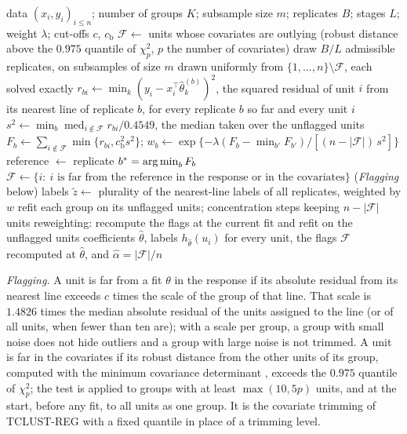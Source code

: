 \begin{algorithm}[tbp]
\caption{ESF: clusterwise regression from exactly solved subsamples, with sequential flagging}
\label{alg:adaptive}
\begin{algorithmic}[1]
\Require data $(x_i,y_i)_{i\le n}$; number of groups $K$; subsample size $m$; replicates $B$;
stages $L$; weight $\lambda$; cut-offs $c$, $c_{\mathrm b}$
\State $\mathcal F\leftarrow$ units whose covariates are outlying (robust distance above the
$0.975$ quantile of $\chi^{2}_{p}$, $p$ the number of covariates)
  \State draw $B/L$ admissible replicates, on subsamples of size $m$ drawn uniformly from
    $\{1,\dots,n\}\setminus\mathcal F$, each solved exactly
  \State $r_{bi}\leftarrow\min_k(y_i-x_i^{\top}\hat\theta^{(b)}_k)^{2}$, the squared residual
    of unit $i$ from its nearest line of replicate $b$, for every replicate $b$ so far and
    every unit $i$
  \State $s^{2}\leftarrow\min_b\operatorname{med}_{i\notin\mathcal F}r_{bi}/0.4549$, the median
    taken over the unflagged units
  \State $F_b\leftarrow\sum_{i\notin\mathcal F}\min\{r_{bi},c_{\mathrm b}^{2}s^{2}\}$;\quad
    $w_b\leftarrow\exp\{-\lambda(F_b-\min_{b'}F_{b'})/[(n-|\mathcal F|)\,s^{2}]\}$
  \State reference $\leftarrow$ replicate $b^{\ast}=\operatorname*{arg\,min}_bF_b$
  \State $\mathcal F\leftarrow\{i:\ \text{$i$ is far from the reference in the response or in
    the covariates}\}$ (\emph{Flagging} below)
\EndFor
\State labels $\tilde z\leftarrow$ plurality of the nearest-line labels of all replicates,
  weighted by $w$
\State refit each group on its unflagged units; concentration steps keeping $n-|\mathcal F|$
  units
\State reweighting: recompute the flags at the current fit and refit on the unflagged units
\State \Return coefficients $\hat\theta$, labels $h_{\hat\theta}(u_i)$ for every unit, the flags
  $\mathcal F$ recomputed at $\hat\theta$, and $\hat\alpha=|\mathcal F|/n$
\end{algorithmic}
\end{algorithm}

\emph{Flagging.} A unit is far from a fit $\theta$ in the response if its absolute residual
from its nearest line exceeds $c$ times the scale of the group of that line. That scale is
$1.4826$ times the median absolute residual of the units assigned to the line (or of all
units, when fewer than ten are); with a scale per group, a group with small noise does not
hide outliers and a group with large noise is not trimmed. A unit is far in the covariates if its robust distance from the other
units of its group, computed with the minimum covariance determinant \citep{rousseeuw1999fast},
exceeds the $0.975$ quantile of $\chi^{2}_p$; the test is applied to groups with at least
$\max(10,5p)$ units, and at the start, before any fit, to all units as one group. It is the
covariate trimming of TCLUST-REG \citep{garciaescudero2010robust} with a fixed quantile in
place of a trimming level.

